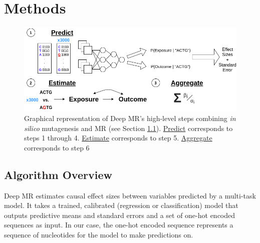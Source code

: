 \section{Methods}%
\label{sec:methods}


\begin{figure}[htpb]
    \centering
    \includegraphics[width=.8\linewidth]{fig/model_overview.png}
    \vspace{-12pt}
    \caption{Graphical representation of Deep MR's high-level steps combining \textit{in silico} mutagenesis and MR (see Section \ref{sub:algo_overview}). \underline{Predict} corresponds to steps 1 through 4. \underline{Estimate} corresponds to step 5. \underline{Aggregate} corresponds to step 6}
    \vspace{-10pt}
    \label{fig:model_overview}
\end{figure}

\subsection{Algorithm Overview}%
\label{sub:algo_overview}


Deep MR estimates causal effect sizes between variables predicted by a multi-task model. It takes a trained, calibrated (regression or classification) model that outputs predictive means and standard errors and a set of one-hot encoded sequences as input. In our case, the one-hot encoded sequence represents a sequence of nucleotides for the model to make predictions on.

